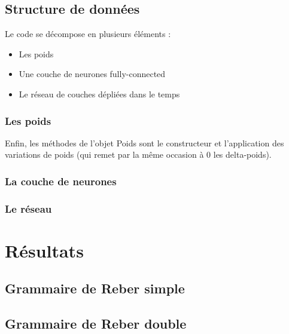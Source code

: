 \bigskip

\subsection{Structure de données}

Le code se décompose en plusieurs éléments : 
\begin{itemize}
  \item Les poids
  \item Une couche de neurones fully-connected
  \item Le réseau de couches dépliées dans le temps
\end{itemize}

\subsubsection{Les poids}


Enfin, les méthodes de l'objet Poids sont le constructeur et
l'application des variations de poids (qui remet par la même occasion à 0
les delta-poids).

\subsubsection{La couche de neurones}


\subsubsection{Le réseau}


\section{Résultats}
\subsection{Grammaire de Reber simple}
\subsection{Grammaire de Reber double}
